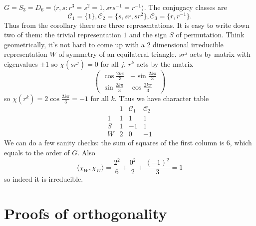 \documentclass[a4paper]{article}
\newcommand{\ccl}{{\mathcal C}} %
\theoremstyle{definition}
\begin{document}
\begin{eg}
  \(G = S_3 = D_6 = \langle r, s: r^3 = s^2 = 1, srs^{-1} = r^{-1} \rangle\). The conjugacy classes are
  \[
    \ccl_1 = \{1\}, \ccl_2 = \{s, sr, sr^2\}, \ccl_3 = \{r, r^{-1}\}.
  \]
  Thus from the corollary there are three representations. It is easy to write down two of them: the trivial representation \(1\) and the sign \(S\) of permutation. Think geometrically, it's not hard to come up with a \(2\) dimensional irreducible representation \(W\) of symmetry of an equilateral triangle. \(sr^j\) acts by matrix with eigenvalues \(\pm 1\) so \(\chi(sr^j) = 0\) for all \(j\). \(r^k\) acts by the matrix
  \[
    \begin{pmatrix}
      \cos \frac{2k\pi}{3} & - \sin \frac{2k\pi}{3} \\
      \sin \frac{2k\pi}{3} & \cos \frac{2k\pi}{3}
    \end{pmatrix}
  \]
  so \(\chi(r^k) = 2 \cos \frac{2k\pi}{3} = - 1\) for all \(k\). Thus we have character table
  \[
    \begin{array}{c|ccc}
      & 1 & \ccl_1 & \ccl_2 \\ \hline
      1 & 1 & 1 & 1 \\
      S & 1 & -1 & 1 \\
      W & 2 & 0 & -1
    \end{array}
  \]
  We can do a few sanity checks: the sum of squares of the first column is \(6\), which equals to the order of \(G\). Also
  \[
    \langle \chi_W, \chi_W \rangle
    = \frac{2^2}{6} + \frac{0^2}{2} + \frac{(-1)^2}{3}
    = 1
  \]
  so indeed it is irreducible.
\end{eg}

\section{Proofs of orthogonality}

\end{document}
